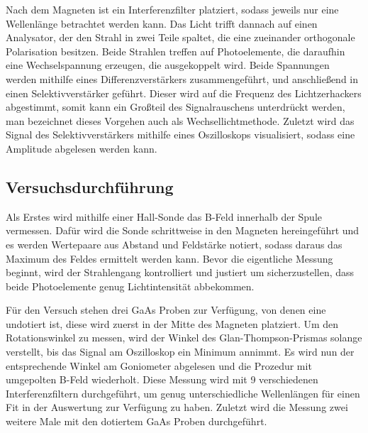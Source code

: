 Nach dem Magneten ist ein Interferenzfilter platziert, sodass jeweils nur eine Wellenlänge betrachtet werden kann. Das Licht trifft dannach auf
einen Analysator, der den Strahl in zwei Teile spaltet, die eine zueinander orthogonale Polarisation besitzen. Beide Strahlen treffen
auf Photoelemente, die daraufhin eine Wechselspannung erzeugen, die ausgekoppelt wird. Beide Spannungen werden mithilfe eines Differenzverstärkers
zusammengeführt, und anschließend in einen Selektivverstärker geführt. Dieser wird auf die Frequenz des Lichtzerhackers abgestimmt, somit kann ein
Großteil des Signalrauschens unterdrückt werden, man bezeichnet dieses Vorgehen auch als Wechsellichtmethode.
Zuletzt wird das Signal des Selektivverstärkers mithilfe eines Oszilloskops visualisiert, sodass eine Amplitude abgelesen werden kann.

\subsection{Versuchsdurchführung}

Als Erstes wird mithilfe einer Hall-Sonde das B-Feld innerhalb der Spule vermessen. Dafür wird die Sonde schrittweise in den Magneten hereingeführt
und es werden Wertepaare aus Abstand und Feldstärke notiert, sodass daraus das Maximum des Feldes ermittelt werden kann.
Bevor die eigentliche Messung beginnt, wird der Strahlengang kontrolliert und justiert um sicherzustellen, dass beide Photoelemente genug Lichtintensität
abbekommen.

Für den Versuch stehen drei GaAs Proben zur Verfügung, von denen eine undotiert ist, diese wird zuerst in der Mitte des Magneten platziert.
Um den Rotationswinkel zu messen, wird der Winkel des Glan-Thompson-Prismas
solange verstellt, bis das Signal am Oszilloskop ein Minimum annimmt. Es wird nun der entsprechende Winkel am Goniometer abgelesen und
die Prozedur mit umgepolten B-Feld wiederholt. Diese Messung wird mit 9 verschiedenen Interferenzfiltern durchgeführt, um genug unterschiedliche Wellenlängen für einen
Fit in der Auswertung zur Verfügung zu haben.
Zuletzt wird die Messung zwei weitere Male mit den dotiertem GaAs Proben durchgeführt.